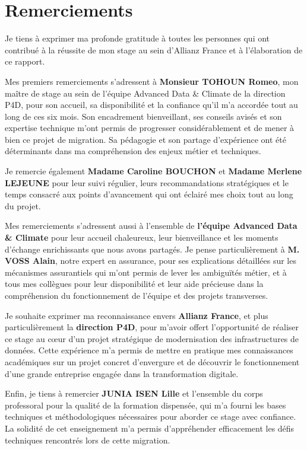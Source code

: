 \chapter*{Remerciements}

Je tiens à exprimer ma profonde gratitude à toutes les personnes qui ont contribué à la réussite de mon stage au sein d'Allianz France et à l'élaboration de ce rapport.

Mes premiers remerciements s'adressent à \textbf{Monsieur TOHOUN Romeo}, mon maître de stage au sein de l'équipe Advanced Data \& Climate de la direction P4D, pour son accueil, sa disponibilité et la confiance qu'il m'a accordée tout au long de ces six mois. Son encadrement bienveillant, ses conseils avisés et son expertise technique m'ont permis de progresser considérablement et de mener à bien ce projet de migration. Sa pédagogie et son partage d'expérience ont été déterminants dans ma compréhension des enjeux métier et techniques.

Je remercie également \textbf{Madame Caroline BOUCHON} et \textbf{Madame Merlene LEJEUNE} pour leur suivi régulier, leurs recommandations stratégiques et le temps consacré aux points d'avancement qui ont éclairé mes choix tout au long du projet.

Mes remerciements s'adressent aussi à l'ensemble de \textbf{l'équipe Advanced Data \& Climate} pour leur accueil chaleureux, leur bienveillance et les moments d'échange enrichissants que nous avons partagés. Je pense particulièrement à \textbf{M. VOSS Alain}, notre expert en assurance, pour ses explications détaillées sur les mécanismes assurantiels qui m'ont permis de lever les ambiguïtés métier, et à tous mes collègues pour leur disponibilité et leur aide précieuse dans la compréhension du fonctionnement de l'équipe et des projets transverses.

Je souhaite exprimer ma reconnaissance envers \textbf{Allianz France}, et plus particulièrement la \textbf{direction P4D}, pour m'avoir offert l'opportunité de réaliser ce stage au cœur d'un projet stratégique de modernisation des infrastructures de données. Cette expérience m'a permis de mettre en pratique mes connaissances académiques sur un projet concret d'envergure et de découvrir le fonctionnement d'une grande entreprise engagée dans la transformation digitale.

Enfin, je tiens à remercier \textbf{JUNIA ISEN Lille} et l'ensemble du corps professoral pour la qualité de la formation dispensée, qui m'a fourni les bases techniques et méthodologiques nécessaires pour aborder ce stage avec confiance. La solidité de cet enseignement m'a permis d'appréhender efficacement les défis techniques rencontrés lors de cette migration.
